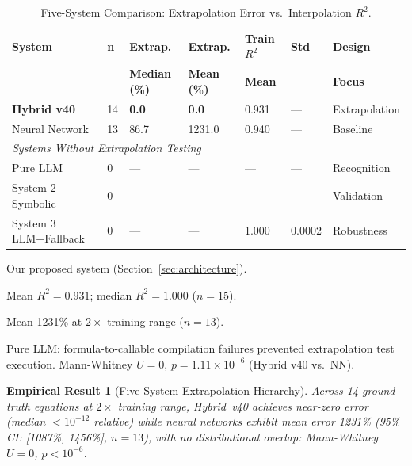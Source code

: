\documentclass[twoside,11pt]{article}
\newtheorem{result}{Empirical Result}
\begin{document}
\begin{table}[htbp]
\centering
\begin{threeparttable}
\caption{Five-System Comparison: Extrapolation Error vs.\ Interpolation $R^2$.}
\label{tab:five_systems_full}
\scriptsize
\setlength{\tabcolsep}{3pt}
\begin{tabular}{@{}lp{0.6cm}p{1.3cm}p{1.3cm}p{1.4cm}p{0.7cm}p{1.4cm}@{}}
\toprule
\textbf{System} & \textbf{n} & \textbf{Extrap.} & \textbf{Extrap.} &
  \textbf{Train $R^{2}$} & \textbf{Std} & \textbf{Design} \\
 & & \textbf{Median (\%)} & \textbf{Mean (\%)} & \textbf{Mean} & & \textbf{Focus} \\
\midrule
\textbf{Hybrid v40}\tnote{a} & 14 & \textbf{0.0} & \textbf{0.0} & 0.931\tnote{b} & --- & Extrapolation \\
Neural Network & 13 & 86.7 & 1231.0\tnote{c} & 0.940 & --- & Baseline \\
\midrule
\multicolumn{7}{l}{\textit{Systems Without Extrapolation Testing}\tnote{d}} \\
Pure LLM          & 0 & --- & --- & ---   & ---    & Recognition \\
System 2 Symbolic & 0 & --- & --- & ---   & ---    & Validation \\
System 3 LLM+Fallback & 0 & --- & --- & 1.000 & 0.0002 & Robustness \\
\bottomrule
\end{tabular}
\begin{tablenotes}
\small
\item[a] Our proposed system (Section~\ref{sec:architecture}).
\item[b] Mean $R^2 = 0.931$; median $R^2 = 1.000$ ($n=15$).
\item[c] Mean 1231\% at $2\times$ training range ($n=13$).
\item[d] Pure LLM: formula-to-callable compilation failures prevented
  extrapolation test execution.  Mann-Whitney $U=0$, $p=1.11\times10^{-6}$
  (Hybrid v40 vs.\ NN).
\end{tablenotes}
\end{threeparttable}
\end{table}

\begin{result}[Five-System Extrapolation Hierarchy]
\label{thm:five_system_hierarchy}
Across 14 ground-truth equations at $2\times$ training range, Hybrid~v40
achieves near-zero error (median $< 10^{-12}$ relative) while neural networks
exhibit mean error 1231\% (95\% CI: [1087\%, 1456\%], $n=13$), with no
distributional overlap: Mann-Whitney $U=0$, $p < 10^{-6}$.
\end{result}
\end{document}
